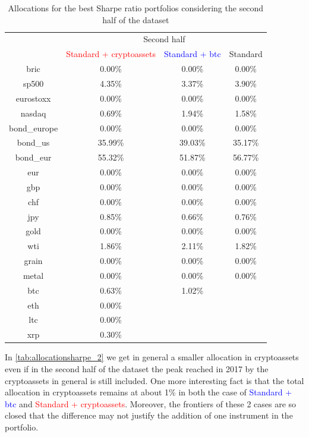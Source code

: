 \begin{table}[H]
    \centering
    \begin{tabular}{c|ccc|}
         &  \multicolumn{3}{c|}{Second half} \\
         \cline{2-4}
          & \textcolor{red}{Standard + cryptoassets} & \textcolor{blue}{Standard + btc} & Standard \\
          \hline
          bric & 0.00\% & 0.00\% & 0.00\%\\
          sp500 & 4.35\% & 3.37\% & 3.90\%\\
          eurostoxx & 0.00\% & 0.00\% & 0.00\%\\
          nasdaq & 0.69\% & 1.94\% & 1.58\%\\
          bond\_europe & 0.00\% & 0.00\% & 0.00\%\\
          bond\_us & 35.99\% & 39.03\% & 35.17\%\\
          bond\_eur & 55.32\% & 51.87\% & 56.77\%\\
          eur & 0.00\% & 0.00\% & 0.00\%\\
          gbp & 0.00\% & 0.00\% & 0.00\%\\
          chf & 0.00\% & 0.00\% & 0.00\%\\
          jpy & 0.85\% & 0.66\% & 0.76\%\\
          gold & 0.00\% & 0.00\% & 0.00\%\\
          wti & 1.86\% & 2.11\% & 1.82\%\\
          grain & 0.00\% & 0.00\% & 0.00\%\\
          metal & 0.00\% & 0.00\% & 0.00\%\\
          btc & 0.63\% & 1.02\% &\\
          eth & 0.00\% & &\\
          ltc & 0.00\% & &\\
          xrp & 0.30\% & & \\
    \end{tabular}
    \caption{Allocations for the best Sharpe ratio portfolios considering the second half of the dataset}
    \label{tab:allocationsharpe_2}
\end{table}

In \autoref{tab:allocationsharpe_2} we get in general a smaller allocation in cryptoassets even if in the second half of the dataset the peak reached in 2017 by the cryptoassets in general is still included. One more interesting fact is that the total allocation in cryptoassets remains at about 1\% in both the case of \textcolor{blue}{Standard + btc} and \textcolor{red}{Standard + cryptoassets}.
Moreover, the frontiers of these 2 cases are so closed that the difference may not justify the addition of one instrument in the portfolio.

